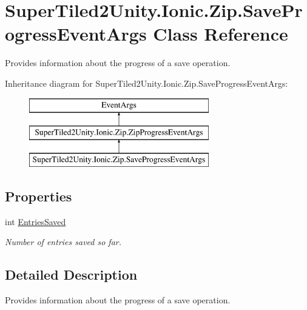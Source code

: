 \hypertarget{class_super_tiled2_unity_1_1_ionic_1_1_zip_1_1_save_progress_event_args}{}\section{Super\+Tiled2\+Unity.\+Ionic.\+Zip.\+Save\+Progress\+Event\+Args Class Reference}
\label{class_super_tiled2_unity_1_1_ionic_1_1_zip_1_1_save_progress_event_args}


Provides information about the progress of a save operation.  


Inheritance diagram for Super\+Tiled2\+Unity.\+Ionic.\+Zip.\+Save\+Progress\+Event\+Args\+:\begin{figure}[H]
\begin{center}
\leavevmode
\includegraphics[height=3.000000cm]{class_super_tiled2_unity_1_1_ionic_1_1_zip_1_1_save_progress_event_args}
\end{center}
\end{figure}
\subsection*{Properties}
\begin{DoxyCompactItemize}
\item 
int \mbox{\hyperlink{class_super_tiled2_unity_1_1_ionic_1_1_zip_1_1_save_progress_event_args_a1a946188def2ed37d54e47bec387fb8c}{Entries\+Saved}}
\begin{DoxyCompactList}\small\item\em Number of entries saved so far. \end{DoxyCompactList}\end{DoxyCompactItemize}


\subsection{Detailed Description}
Provides information about the progress of a save operation. 



